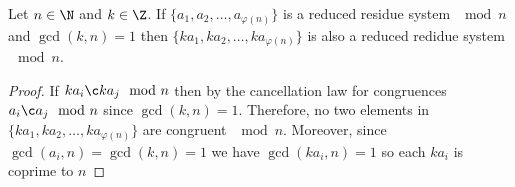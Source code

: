 \begin{nprop}
   Let $n \in \N$ and $k \in \Z$. If $\{a_1, a_2, \dots, a_{\varphi(n)}\}$ is a reduced residue system $\mod n$ and $\gcd(k, n) = 1$ then $\{ka_1, ka_2, \dots, ka_{\varphi(n)}\}$ is also a reduced redidue system $\mod n$.
\end{nprop}
\begin{proof}
  If $ka_i \c ka_j\mod n$ then by the cancellation law for congruences $a_i \c a_j\mod n$ since $\gcd(k, n) =1$. Therefore, no two elements in $\{ka_1, ka_2, \dots, ka_{\varphi(n)}\}$ are congruent $\mod n$. Moreover, since $\gcd(a_i, n) = \gcd(k, n) = 1$ we have $\gcd(ka_i, n) = 1$ so each $ka_i$ is coprime to $n$
\end{proof}

